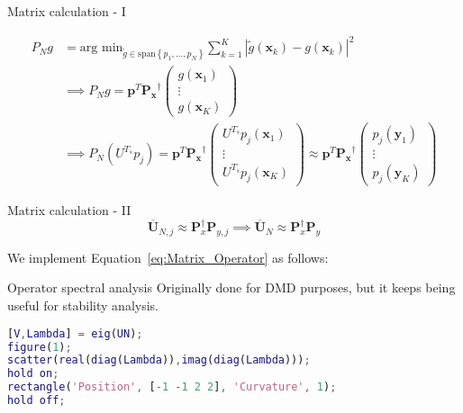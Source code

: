 \documentclass{beamer}
\begin{document}
\begin{frame}{Matrix calculation - I}

    \begin{align}
        P_N g &= \text{arg min}_{\tilde{g} \in \text{span}\left\{p_1 , \dots , p_N\right\}} \sum_{k=1}^K \left|\tilde{g}\left(\mathbf{x}_k\right) - g\left(\mathbf{x}_k\right)\right|^2 \\
        &\implies P_N g = \mathbf{p}^T \mathbf{P_x}^\dagger
        \begin{pmatrix}
            g\left(\mathbf{x}_1\right) \\
            \vdots \\
            g\left(\mathbf{x}_K\right)
        \end{pmatrix} \\
        & \implies P_N \left(U^{T_s} p_j\right) = \mathbf{p}^T \mathbf{P_x}^\dagger
        \begin{pmatrix}
            U^{T_s} p_j\left(\mathbf{x}_1\right) \\
            \vdots \\
            U^{T_s} p_j\left(\mathbf{x}_K\right)
        \end{pmatrix}
        \approx \mathbf{p}^T \mathbf{P_x}^\dagger
        \begin{pmatrix}
            p_j\left(\mathbf{y}_1\right) \\
            \vdots \\
            p_j\left(\mathbf{y}_K\right)
        \end{pmatrix}
    \end{align}
\end{frame}

\begin{frame}{Matrix calculation - II}
    \begin{equation} \label{eq:Matrix_Operator}
        \overline{\mathbf{U}}_{N,j} \approx \mathbf{P}_x^\dagger \mathbf{P}_{y,j} \implies \overline{\mathbf{U}}_N \approx \mathbf{P}_x^\dagger \mathbf{P}_y
    \end{equation}
    
    We implement Equation~\ref{eq:Matrix_Operator} as follows:

    \begin{center}
    \end{center}
\end{frame}

\begin{frame}[fragile]{Operator spectral analysis}
    Originally done for DMD purposes, but it keeps being useful for stability analysis.

    \begin{lstlisting}[language=Matlab]
[V,Lambda] = eig(UN);
figure(1);
scatter(real(diag(Lambda)),imag(diag(Lambda)));
hold on;
rectangle('Position', [-1 -1 2 2], 'Curvature', 1);
hold off;
    \end{lstlisting}
\end{frame}
\end{document}
